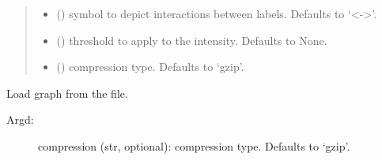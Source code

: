 \documentclass[letterpaper,10pt,english]{sphinxmanual}
\begin{document}
\begin{fulllineitems}
\begin{fulllineitems}
\begin{quote}
\begin{description}
\begin{itemize}
\item {} 
 (\sphinxstyleliteralemphasis{\sphinxupquote{, }}) \textendash{} symbol to depict interactions
between labels. Defaults to ‘\textless{}-\textgreater{}’.

\item {} 
 (\sphinxstyleliteralemphasis{\sphinxupquote{, }}) \textendash{} threshold to apply to the intensity.
Defaults to None.

\item {} 
 (\sphinxstyleliteralemphasis{\sphinxupquote{, }}) \textendash{} compression type. Defaults to ‘gzip’.

\end{itemize}

\end{description}\end{quote}

\end{fulllineitems}


\begin{fulllineitems}
\end{fulllineitems}


\begin{fulllineitems}
\end{fulllineitems}


\begin{fulllineitems}
\label{\detokenize{_modules/cosifer.handlers:cosifer.handlers.network_handler.NetworkHandler.load}}
Load graph from the file.
\begin{description}
\item[{Argd:}] \leavevmode
compression (str, optional): compression type. Defaults to ‘gzip’.


\end{description}
\end{fulllineitems}
\end{fulllineitems}
\end{document}
